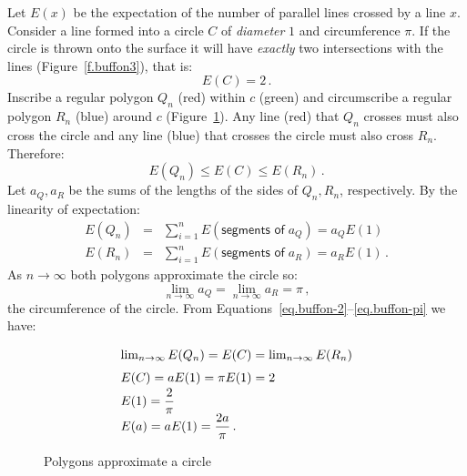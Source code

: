 Let $E(x)$ be the expectation of the number of parallel lines crossed by a line $x$. Consider a line formed into a circle $C$ of \emph{diameter} $1$ and circumference $\pi$. If the circle is thrown onto the surface it will have \emph{exactly} two intersections with the lines (Figure~\ref{f.buffon3}), that is:
\begin{equation}\label{eq.buffon-2}
E(C)=2\,.
\end{equation}
Inscribe a regular polygon $Q_n$ (red) within $c$ (green) and circumscribe a regular polygon $R_n$ (blue) around $c$ (Figure~\ref{f.buffon4}). Any line (red) that $Q_n$ crosses must also cross the circle and any line (blue) that crosses the circle must also cross $R_n$. Therefore:
\begin{equation}\label{eq.buffon3}
E(Q_n)\leq E(C)\leq E(R_n)\,.
\end{equation}
Let $a_Q, a_R$ be the sums of the lengths of the sides of $Q_n,R_n$, respectively. By the linearity of expectation:
\begin{eqnarray}\label{eq.buffon1a}
E(Q_n)&=&\sum_{i=1}^n E(\textsf{segments of}\;a_Q)=a_QE(1)\\
\label{eq.buffon1b}E(R_n)&=&\sum_{i=1}^n E(\textsf{segments of}\;a_R)=a_RE(1)\,. 
\end{eqnarray}
As $n\rightarrow\infty$ both polygons approximate the circle so:
\begin{equation}\label{eq.buffon-pi}
\lim_{n\rightarrow\infty}a_Q = \lim_{n\rightarrow\infty} a_R=\pi\,,
\end{equation}
the circumference of the circle. From Equations~\ref{eq.buffon-2}--\ref{eq.buffon-pi} we have:
\[
\renewcommand*{\arraystretch}{1.5}
\begin{array}{l}
\lim_{n\rightarrow\infty}E(Q_n)=E(C) =\lim_{n\rightarrow\infty}E(R_n)\\
E(C)=aE(1) =\pi E(1) = 2\\
E(1)=\disfrac{2}{\pi}\\
E(a)=aE(1)=\disfrac{2a}{\pi}\,.
\end{array}
\]
\begin{figure}[bt]
\begin{center}
\end{center}
\caption{Polygons approximate a circle}\label{f.buffon4}
\end{figure}

